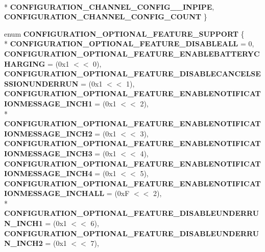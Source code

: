 \begin{DoxyCompactItemize}
\\*
{\bf C\+O\+N\+F\+I\+G\+U\+R\+A\+T\+I\+O\+N\+\_\+\+C\+H\+A\+N\+N\+E\+L\+\_\+\+C\+O\+N\+F\+I\+G\+\_\+\_\+\+I\+N\+P\+I\+PE}, 
{\bf C\+O\+N\+F\+I\+G\+U\+R\+A\+T\+I\+O\+N\+\_\+\+C\+H\+A\+N\+N\+E\+L\+\_\+\+C\+O\+N\+F\+I\+G\+\_\+\+C\+O\+U\+NT}
 \}
\item 
enum {\bf C\+O\+N\+F\+I\+G\+U\+R\+A\+T\+I\+O\+N\+\_\+\+O\+P\+T\+I\+O\+N\+A\+L\+\_\+\+F\+E\+A\+T\+U\+R\+E\+\_\+\+S\+U\+P\+P\+O\+RT} \{ \\*
{\bf C\+O\+N\+F\+I\+G\+U\+R\+A\+T\+I\+O\+N\+\_\+\+O\+P\+T\+I\+O\+N\+A\+L\+\_\+\+F\+E\+A\+T\+U\+R\+E\+\_\+\+D\+I\+S\+A\+B\+L\+E\+A\+LL} = 0, 
{\bf C\+O\+N\+F\+I\+G\+U\+R\+A\+T\+I\+O\+N\+\_\+\+O\+P\+T\+I\+O\+N\+A\+L\+\_\+\+F\+E\+A\+T\+U\+R\+E\+\_\+\+E\+N\+A\+B\+L\+E\+B\+A\+T\+T\+E\+R\+Y\+C\+H\+A\+R\+G\+I\+NG} = (0x1 $<$$<$ 0), 
{\bf C\+O\+N\+F\+I\+G\+U\+R\+A\+T\+I\+O\+N\+\_\+\+O\+P\+T\+I\+O\+N\+A\+L\+\_\+\+F\+E\+A\+T\+U\+R\+E\+\_\+\+D\+I\+S\+A\+B\+L\+E\+C\+A\+N\+C\+E\+L\+S\+E\+S\+S\+I\+O\+N\+U\+N\+D\+E\+R\+R\+UN} = (0x1 $<$$<$ 1), 
{\bf C\+O\+N\+F\+I\+G\+U\+R\+A\+T\+I\+O\+N\+\_\+\+O\+P\+T\+I\+O\+N\+A\+L\+\_\+\+F\+E\+A\+T\+U\+R\+E\+\_\+\+E\+N\+A\+B\+L\+E\+N\+O\+T\+I\+F\+I\+C\+A\+T\+I\+O\+N\+M\+E\+S\+S\+A\+G\+E\+\_\+\+I\+N\+C\+H1} = (0x1 $<$$<$ 2), 
\\*
{\bf C\+O\+N\+F\+I\+G\+U\+R\+A\+T\+I\+O\+N\+\_\+\+O\+P\+T\+I\+O\+N\+A\+L\+\_\+\+F\+E\+A\+T\+U\+R\+E\+\_\+\+E\+N\+A\+B\+L\+E\+N\+O\+T\+I\+F\+I\+C\+A\+T\+I\+O\+N\+M\+E\+S\+S\+A\+G\+E\+\_\+\+I\+N\+C\+H2} = (0x1 $<$$<$ 3), 
{\bf C\+O\+N\+F\+I\+G\+U\+R\+A\+T\+I\+O\+N\+\_\+\+O\+P\+T\+I\+O\+N\+A\+L\+\_\+\+F\+E\+A\+T\+U\+R\+E\+\_\+\+E\+N\+A\+B\+L\+E\+N\+O\+T\+I\+F\+I\+C\+A\+T\+I\+O\+N\+M\+E\+S\+S\+A\+G\+E\+\_\+\+I\+N\+C\+H3} = (0x1 $<$$<$ 4), 
{\bf C\+O\+N\+F\+I\+G\+U\+R\+A\+T\+I\+O\+N\+\_\+\+O\+P\+T\+I\+O\+N\+A\+L\+\_\+\+F\+E\+A\+T\+U\+R\+E\+\_\+\+E\+N\+A\+B\+L\+E\+N\+O\+T\+I\+F\+I\+C\+A\+T\+I\+O\+N\+M\+E\+S\+S\+A\+G\+E\+\_\+\+I\+N\+C\+H4} = (0x1 $<$$<$ 5), 
{\bf C\+O\+N\+F\+I\+G\+U\+R\+A\+T\+I\+O\+N\+\_\+\+O\+P\+T\+I\+O\+N\+A\+L\+\_\+\+F\+E\+A\+T\+U\+R\+E\+\_\+\+E\+N\+A\+B\+L\+E\+N\+O\+T\+I\+F\+I\+C\+A\+T\+I\+O\+N\+M\+E\+S\+S\+A\+G\+E\+\_\+\+I\+N\+C\+H\+A\+LL} = (0xF $<$$<$ 2), 
\\*
{\bf C\+O\+N\+F\+I\+G\+U\+R\+A\+T\+I\+O\+N\+\_\+\+O\+P\+T\+I\+O\+N\+A\+L\+\_\+\+F\+E\+A\+T\+U\+R\+E\+\_\+\+D\+I\+S\+A\+B\+L\+E\+U\+N\+D\+E\+R\+R\+U\+N\+\_\+\+I\+N\+C\+H1} = (0x1 $<$$<$ 6), 
{\bf C\+O\+N\+F\+I\+G\+U\+R\+A\+T\+I\+O\+N\+\_\+\+O\+P\+T\+I\+O\+N\+A\+L\+\_\+\+F\+E\+A\+T\+U\+R\+E\+\_\+\+D\+I\+S\+A\+B\+L\+E\+U\+N\+D\+E\+R\+R\+U\+N\+\_\+\+I\+N\+C\+H2} = (0x1 $<$$<$ 7), 
$$
\end{DoxyCompactItemize}
